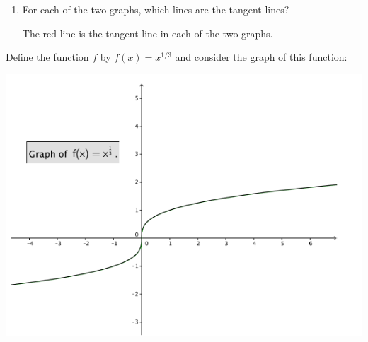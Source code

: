 \documentclass[nooutcomes, handout]{ximera}
\begin{document}
\begin{problem}
\begin{enumerate}
    \item 
      For each of the two graphs, which lines are the tangent lines?
      \begin{freeResponse}
        The red line is the tangent line in each of the two graphs.        
      \end{freeResponse}

  \end{enumerate}
\end{problem}


	
\begin{problem}
  Define the function $f$ by $f(x) = x^{1/3}$ and consider the graph of this function:
  \begin{image}
    \includegraphics[scale = 0.5]{figure1.png}
  \end{image}


\end{problem}
\end{document}
